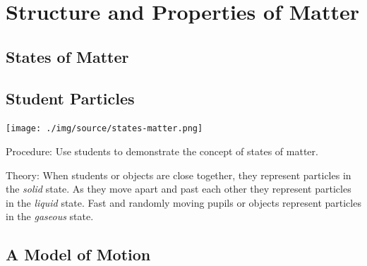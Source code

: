 \section{Structure and Properties of Matter}

\begin{multicols}{2}

\section*{States of Matter} \label{sec:states-matter}


\subsection{Student Particles}

\begin{center}
\texttt{[image: ./img/source/states-matter.png]}
\end{center}

\begin{description*}
\item[Procedure:]{Use students to demonstrate the concept of states of matter.}
\item[Theory:]{When students or objects are close together, they represent particles in the \emph{solid} state. As they move apart and past each other they represent particles in the \emph{liquid} state. Fast and randomly moving pupils or objects represent particles in the \emph{gaseous} state.}
\end{description*}

\subsection{A Model of Motion}


\end{multicols}
